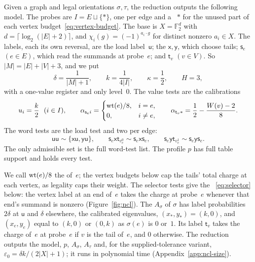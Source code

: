 Given a graph and legal orientations $\sigma,\tau$, the reduction outputs
the following model. The probes are $I=E\sqcup\{\ast\}$, one per edge and a
~$\ast$ for the unused part of each vertex
budget~\eqref{eq:vertex-budget}. The base is $X=\mathbb F_2^d$ with
$d=\lceil\log_2(|E|+2)\rceil$, and
$\chi_i(g)=(-1)^{a_i\cdot g}$ for distinct nonzero $a_i\in X$. The labels,
each its own reversal, are the load label~$\mathsf u$; the
 $\mathsf x,\mathsf y$, which choose tails;
 $\mathsf s_e$ $(e\in E)$, which read the summands
at probe~$e$; and  $\mathsf t_v$ $(v\in V)$. So
$|M|=|E|+|V|+3$, and we put
\[
  \delta=\frac1{|M|+1},\qquad k=\frac1{4|I|},\qquad\kappa=\frac12,\qquad
  H=3,
\]
with a one-value register and only level~$0$. The value tests are the
calibrations
\[
  u_i=\frac k2\ \ (i\in I),\qquad
  \alpha_{\mathsf s_ei}=
  \begin{cases}\operatorname{wt}(e)/8,&i=e,\\0,&i\neq e,\end{cases}\qquad
  \alpha_{\mathsf t_v\ast}=\frac12-\frac{W(v)-2}8 .
\]
The word tests are the load test and two  per
edge:
\[
  \mathsf{uu}\sim\{\mathsf{xu},\mathsf{yu}\},\qquad
  \mathsf s_e\mathsf x\mathsf t_{v_e^0}\sim\mathsf s_e\mathsf x\mathsf s_e,
  \qquad
  \mathsf s_e\mathsf y\mathsf t_{v_e^1}\sim\mathsf s_e\mathsf y\mathsf s_e .
\]
The only admissible set is the full word-test list. The profile $p$ has
full table support and holds every test.

We call $\operatorname{wt}(e)/8$ the  of~$e$; the vertex budgets below
cap the tails' total charge at each vertex, as legality caps their weight. The selector tests give the
~\eqref{eq:selector} below: the vertex label at
an end of~$e$ takes the charge at probe~$e$ whenever that end's summand is
nonzero (Figure~\ref{fig:ncl}). The  $A_\sigma$ of
$\sigma$ has label probabilities $2\delta$ at $\mathsf u$ and $\delta$
elsewhere, the calibrated eigenvalues, $(x_\ast,y_\ast)=(k,0)$, and
$(x_e,y_e)$ equal to $(k,0)$ or $(0,k)$ as $\sigma(e)$ is $0$ or~$1$. Its
label $\mathsf t_v$ takes the charge of~$e$ at probe~$e$ if $v$ is the
tail of~$e$, and $0$ otherwise. The reduction outputs the model, $p$,
$A_\sigma$, $A_\tau$ and, for the supplied-tolerance variant,
$\varepsilon_0=\delta k/(2|X|+1)$; it runs in polynomial time
(Appendix~\ref{app:ncl-size}).

